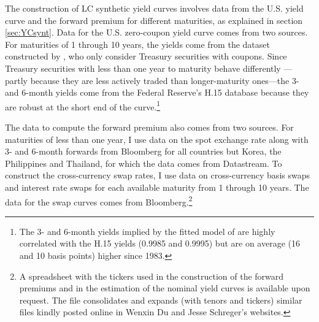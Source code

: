 {The construction of LC synthetic yield curves involves data from the U.S. yield curve and the forward premium for different maturities, as explained in section \ref{sec:YCsynt}. 
Data for the U.S. zero-coupon yield curve comes from two sources. 
For maturities of 1 through 10 years, the yields come from the dataset constructed by \cite{GSW:2007}, who only consider Treasury securities with coupons. %
Since Treasury securities with less than one year to maturity behave differently \citep{Duffee:2010}---partly because  
they are less actively traded than longer-maturity ones---the 3- and 6-month yields come from the Federal Reserve's H.15 database because they
are %
robust at the short end of the curve.\footnote{ The 3- and 6-month yields implied by the fitted model of \cite{GSW:2007} are highly correlated with the H.15 yields (0.9985 and 0.9995) but are on average (16 and 10 basis points) higher since 1983.} %

The data to compute the forward premium also comes from two sources.
For maturities of less than one year, I use data on the spot exchange rate along with 3- and 6-month forwards from Bloomberg for all countries but Korea, the Philippines and Thailand, for which the data comes from Datastream.
To construct the cross-currency swap rates, I use data on cross-currency basis swaps and interest rate swaps for each available maturity from 1 through 10 years. 
The data for the swap curves comes from Bloomberg.\footnote{A spreadsheet with the tickers used in the construction of the forward premiums and in the estimation of the nominal yield curves is available upon request. The file consolidates and expands (with tenors and tickers) similar files kindly posted online in Wenxin Du and Jesse Schreger's websites.}

}
